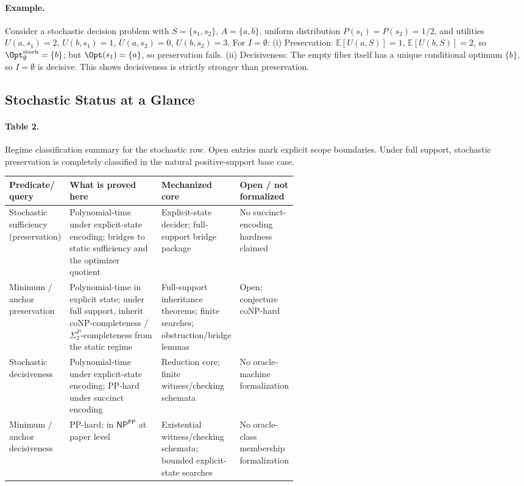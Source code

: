 \paragraph{Example.}
Consider a stochastic decision problem with $S=\{s_1,s_2\}$, $A=\{a,b\}$, uniform distribution $P(s_1)=P(s_2)=1/2$, and utilities $U(a,s_1)=2$, $U(b,s_1)=1$, $U(a,s_2)=0$, $U(b,s_2)=3$. For $I=\emptyset$: (i) Preservation: $\mathbb{E}[U(a,S)]=1$, $\mathbb{E}[U(b,S)]=2$, so $\Opt^{\mathrm{stoch}}_\emptyset=\{b\}$; but $\Opt(s_1)=\{a\}$, so preservation fails. (ii) Decisiveness: The empty fiber itself has a unique conditional optimum $\{b\}$, so $I=\emptyset$ is decisive. This shows decisiveness is strictly stronger than preservation.

\subsection{Stochastic Status at a Glance}

\paragraph{Table 2.} Regime classification summary for the stochastic row. Open entries mark explicit scope boundaries. Under full support, stochastic preservation is completely classified in the natural positive-support base case.

\begingroup
\renewcommand{\tabularxcolumn}[1]{m{#1}}
\begin{tabularx}{\linewidth}{@{}>{\RaggedRight\arraybackslash\hyphenpenalty=10000\exhyphenpenalty=10000}m{0.15\linewidth}>{\RaggedRight\arraybackslash}X>{\RaggedRight\arraybackslash}m{0.22\linewidth}>{\RaggedRight\arraybackslash}m{0.18\linewidth}@{}}
\toprule
\textbf{Predicate/} \textbf{query} & \textbf{What is proved here} & \textbf{Mechanized core} & \textbf{Open / not formalized} \\
\midrule
Stochastic sufficiency (preservation) & Polynomial-time under explicit-state encoding; bridges to static sufficiency and the optimizer quotient & Explicit-state decider; full-support bridge package & No succinct-encoding hardness claimed \\
\midrule
Minimum / anchor preservation & Polynomial-time in explicit state; under full support, inherit coNP-completeness / $\Sigma_2^P$-completeness from the static regime & Full-support inheritance theorems; finite searches; obstruction/bridge lemmas & Open; conjecture coNP-hard \\
\midrule
Stochastic decisiveness & Polynomial-time under explicit-state encoding; PP-hard under succinct encoding & Reduction core; finite witness/checking schemata & No oracle-machine formalization \\
\midrule
Minimum / anchor decisiveness & PP-hard; in $\textsf{NP}^{\textsf{PP}}$ at paper level & Existential witness/checking schemata; bounded explicit-state searches & No oracle-class membership formalization \\
\bottomrule
\end{tabularx}
\endgroup

